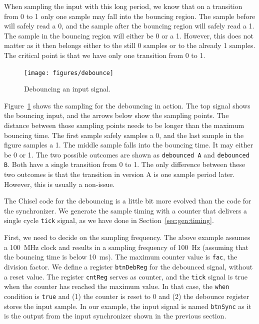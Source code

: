 \documentclass[%
    10pt,
    headinclude, footexclude,
    openright, %
    notitlepage,
    cleardoubleempty,
    headsepline,
    pointlessnumbers,
    bibtotoc, idxtotoc,
    ]{scrbook}
\newcommand{\code}[1]{{\small{\texttt{#1}}}}
\begin{document}
When sampling the input with this long period, we know that on a transition
from 0 to 1 only one sample may fall into the bouncing region.
The sample before will safely read a 0, and the sample after the bouncing
region will safely read a 1. The sample in the bouncing region will
either be  0 or a 1. However, this does not matter as it then belongs either
to the still 0 samples or to the already 1 samples. The critical point
is that we have only one transition from 0 to 1.

\begin{figure}
  \centering
  \texttt{[image: figures/debounce]}
  \caption{Debouncing an input signal.}
  \label{fig:debounce}
\end{figure}

Figure~\ref{fig:debounce} shows the sampling for the debouncing in action.
The top signal shows the bouncing input, and the arrows below show the sampling
points. The distance between those sampling points needs to be longer
than the maximum bouncing time. The first sample safely samples a 0, and the last
sample in the figure samples a 1. The middle sample falls into the
bouncing time. It may either be 0 or 1. The two possible outcomes are
shown as \code{debounced A} and \code{debounced B}.
Both have a single transition from 0 to 1. The only difference between these
two outcomes is that the transition in version A is one sample period later.
However, this is usually a non-issue.

The Chisel code for the debouncing is a little bit more evolved than the
code for the synchronizer.
We generate the sample timing with a counter that delivers a single
cycle \code{tick} signal, as we have done in Section~\ref{sec:gen:timing}.


First, we need to decide on the sampling frequency. The above example
assumes a 100~MHz clock and results in a sampling frequency of 100~Hz
(assuming that the bouncing time is below 10~ms). The maximum
counter value is \code{fac}, the division factor.
We define a register \code{btnDebReg} for the debounced signal,
without a reset value. The register \code{cntReg} serves
as counter, and the \code{tick} signal is true when the counter has
reached the maximum value. In that case, the \code{when} condition
is \code{true} and (1) the counter is reset to 0 and (2) the debounce
register stores the input sample. In our example, the input signal is named
\code{btnSync} as it is the output from the input synchronizer shown
in the previous section.
\end{document}
